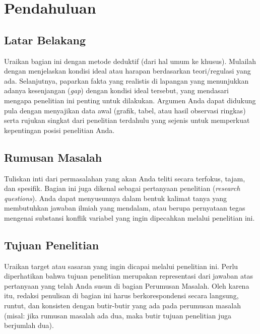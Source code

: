 \chapter{Pendahuluan}


\section{Latar Belakang}

Uraikan bagian ini dengan metode deduktif (dari hal umum ke khusus). Mulailah dengan menjelaskan kondisi ideal atau harapan berdasarkan teori/regulasi yang ada. Selanjutnya, paparkan fakta yang realistis di lapangan yang menunjukkan adanya kesenjangan (\textit{gap}) dengan kondisi ideal tersebut, yang mendasari mengapa penelitian ini penting untuk dilakukan. Argumen Anda dapat didukung pula dengan menyajikan data awal (grafik, tabel, atau hasil observasi ringkas) serta rujukan singkat dari penelitian terdahulu yang sejenis untuk memperkuat kepentingan posisi penelitian Anda.



\section{Rumusan Masalah}

Tuliskan inti dari permasalahan yang akan Anda teliti secara terfokus, tajam, dan spesifik. Bagian ini juga dikenal sebagai pertanyaan penelitian (\textit{research questions}). Anda dapat menyusunnya dalam bentuk kalimat tanya yang membutuhkan jawaban ilmiah yang mendalam, atau berupa pernyataan tegas mengenai substansi konflik variabel yang ingin dipecahkan melalui penelitian ini.



\section{Tujuan Penelitian}

Uraikan target atau sasaran yang ingin dicapai melalui penelitian ini. Perlu diperhatikan bahwa tujuan penelitian merupakan representasi dari jawaban atas pertanyaan yang telah Anda susun di bagian Perumusan Masalah. Oleh karena itu, redaksi penulisan di bagian ini harus berkorespondensi secara langsung, runtut, dan konsisten dengan butir-butir yang ada pada perumusan masalah (misal: jika rumusan masalah ada dua, maka butir tujuan penelitian juga berjumlah dua).



